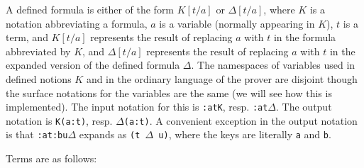 \documentclass{article}
\begin{document}
\begin{itemize}
A defined formula is either of the form $K[t/a]$ or $\Delta[t/a]$, where $K$ is a notation abbreviating a formula, $a$ is a variable (normally appearing in $K$), $t$ is a term, and $K[t/a]$ represents the result of replacing $a$ with $t$ in the formula abbreviated by $K$, and $\Delta[t/a]$ represents the result of replacing $a$ with $t$ in the expanded version of the defined formula $\Delta$.
The namespaces of variables used in defined notions $K$ and in the ordinary language of the prover are disjoint though the surface notations for the variables are the same (we will see how this is implemented).  The input notation for this is {\tt :atK}, resp. {\tt :at$\Delta$}.  The output notation is
{\tt K(a:t)}, resp. {\tt $\Delta$(a:t)}.  A convenient exception in the output notation is that {\tt :at:bu$\Delta$} expands
as {\tt (t $\Delta$ u)}, where the keys are literally {\tt a} and {\tt b}.

\end{itemize}

Terms are as follows:
\end{document}
